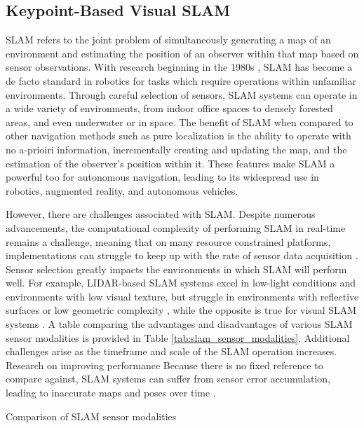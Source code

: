\subsection{Keypoint-Based Visual SLAM}

SLAM refers to the joint problem of simultaneously generating a map of an environment and estimating the position of an observer within that map based on sensor observations. With research beginning in the 1980s \cite{smithEstimatingUncertainSpatial1988}, SLAM has become a de facto standard in robotics for tasks which require operations within unfamiliar environments. Through careful selection of sensors, SLAM systems can operate in a wide variety of environments, from indoor office spaces to densely forested areas, and even underwater or in space. The benefit of SLAM when compared to other navigation methods such as pure localization is the ability to operate with no a-prioiri information, incrementally creating and updating the map, and the estimation of the observer's position within it. These features make SLAM a powerful too for autonomous navigation, leading to its widespread use in robotics, augmented reality, and autonomous vehicles.

However, there are challenges associated with SLAM. Despite numerous advancements, the computational complexity of performing SLAM in real-time remains a challenge, meaning that on many resource constrained platforms, implementations can struggle to keep up with the rate of sensor data acquisition \cite{semenovaQuantitativeAnalysisSystem2022}. Sensor selection greatly impacts the environments in which SLAM will perform well. For example, LIDAR-based SLAM systems excel in low-light conditions and environments with low visual texture, but struggle in environments with reflective surfaces or low geometric complexity \cite{khanComparativeSurveyLiDARSLAM2021}, while the opposite is true for visual SLAM systems \cite{camposORBSLAM3AccurateOpenSource2021a}. A table comparing the advantages and disadvantages of various SLAM sensor modalities is provided in Table \ref{tab:slam_sensor_modalities}. Additional challenges arise as the timeframe and scale of the SLAM operation increases. Research on improving performance Because there is no fixed reference to compare against, SLAM systems can suffer from sensor error accumulation, leading to inaccurate maps and poses over time \cite{cadenaPresentFutureSimultaneous2016}. 

\begin{table}[ht!]
    \centering
    \caption{Comparison of SLAM sensor modalities}
    \label{tab:slam_sensor_modalities}
\end{table}